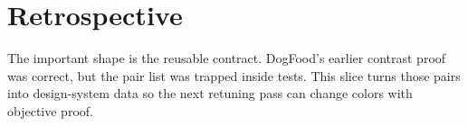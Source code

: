 \section{Retrospective}\label{record-180-retrospective}

The important shape is the reusable contract. DogFood's earlier contrast proof was correct, but the pair list was trapped inside tests. This slice turns those pairs into design-system data so the next retuning pass can change colors with objective proof.

